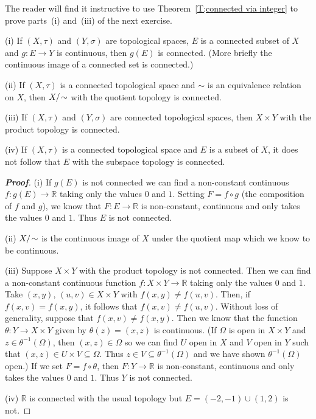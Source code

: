 The reader will find it instructive to use Theorem~\ref{T;connected via integer} to prove parts~(i) and~(iii) of the next exercise.



\begin{theorem}\label{T;quotient connected}
(i) If $(X,\tau)$ and $(Y,\sigma)$ are topological spaces,
$E$ is a connected subset of $X$ and $g:E\rightarrow Y$
is continuous, then $g(E)$ is connected.
(More briefly the continuous image of a connected
set is connected.)

(ii) If $(X,\tau)$ is a connected topological space
and $\sim$ is an equivalence relation on $X$, then $X/\negthinspace\sim$
with the quotient topology is connected.

(iii) If $(X,\tau)$ and $(Y,\sigma)$ are 
connected topological spaces, then $X\times Y$ 
with the product topology is connected.

(iv) If $(X,\tau)$ is a 
connected topological space and $E$ is a subset of $X$,
it does not follow that $E$ with the subspace topology is connected.
\end{theorem}
\begin{proof}[\bf Proof] (i) If $g(E)$ is not connected we can find a non-constant
continuous 
$f:g(E)\rightarrow{\mathbb R}$ taking only the values $0$ and $1$.
Setting $F=f\circ g$ (the composition of $f$ and $g$),
we know that $F:E\rightarrow{\mathbb R}$ is non-constant,
continuous and only takes the values $0$ and $1$.
Thus $E$ is not connected.

(ii) $X/\negthinspace\sim$ is the continuous image of $X$ under the 
quotient map which we know to be continuous.

(iii) Suppose $X\times Y$ with the product topology
is not connected. Then we can find
a non-constant continuous function 
$f:X\times Y\rightarrow{\mathbb R}$ taking only the values $0$ and $1$.
Take $(x,y),\,(u,v)\in X\times Y$ with $f(x,y)\neq f(u,v)$.
Then, if $f(x,v)=f(x,y)$, it follows that $f(x,v)\neq f(u,v)$.
Without loss of generality, suppose that $f(x,v)\neq f(x,y)$.
Then we know that the function $\theta:Y\rightarrow X\times Y$
given by $\theta(z)=(x,z)$ is continuous.
(If $\Omega$ is open in $X\times Y$ and $z\in\theta^{-1}(\Omega)$,
then $(x,z)\in\Omega$ so we can find $U$ open in $X$
and $V$ open in $Y$ such that
$(x,z)\in U\times V\subseteq \Omega$. Thus 
$z\in V\subseteq \theta^{-1}(\Omega)$
and we have shown $\theta^{-1}(\Omega)$ open.)
If we set $F=f\circ\theta$, then
$F:Y\rightarrow{\mathbb R}$ is non-constant,
continuous and only takes the values $0$ and $1$.
Thus $Y$ is not connected.

(iv) ${\mathbb R}$ is connected with the usual topology
but $E=(-2,-1)\cup(1,2)$ is not.
\end{proof}

